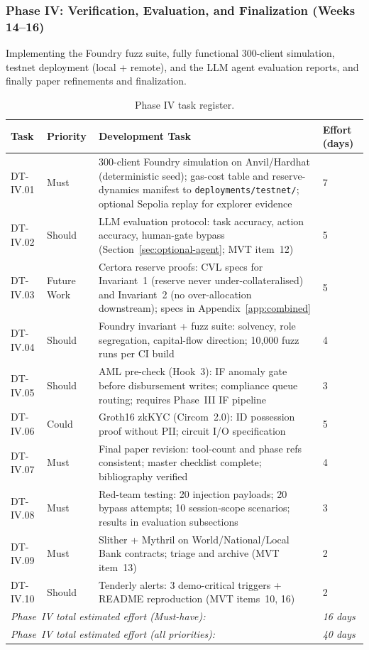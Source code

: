 \documentclass[12pt,a4paper]{report}
\newcommand{\tableheadcolor}{\rowcolor{TableHeadBg}}
\begin{document}
\subsubsection{Phase IV: Verification, Evaluation, and Finalization (Weeks 14--16)}

Implementing the Foundry fuzz suite, fully functional 300-client simulation, testnet deployment (local + remote), and the LLM agent evaluation reports, and finally paper refinements and finalization.

\begin{table}[H]
\centering
\caption[Phase IV task register]{Phase IV task register.}
\label{tab:phaseIV-tasks}
\begin{tabular}{p{1.8cm}p{1.8cm}p{7.5cm}p{1.5cm}}
\toprule
\tableheadcolor
\textbf{Task} & \textbf{Priority} & \textbf{Development Task} & \textbf{Effort (days)} \\
\midrule
DT-IV.01 & Must & 300-client Foundry simulation on Anvil/Hardhat (deterministic seed); gas-cost table and reserve-dynamics manifest to \texttt{deployments/testnet/}; optional Sepolia replay for explorer evidence & 7 \\
DT-IV.02 & Should & LLM evaluation protocol: task accuracy, action accuracy, human-gate bypass (Section~\ref{sec:optional-agent}; MVT item~12) & 5 \\
DT-IV.03 & Future Work & Certora reserve proofs: CVL specs for Invariant~1 (reserve never under-collateralised) and Invariant~2 (no over-allocation downstream); specs in Appendix~\ref{app:combined} & 5 \\
DT-IV.04 & Should & Foundry invariant + fuzz suite: solvency, role segregation, capital-flow direction; 10{,}000 fuzz runs per CI build & 4 \\
DT-IV.05 & Should & AML pre-check (Hook~3): IF anomaly gate before disbursement writes; compliance queue routing; requires Phase~III IF pipeline & 3 \\
DT-IV.06 & Could & Groth16 zkKYC (Circom~2.0): ID possession proof without PII; circuit I/O specification & 5 \\
DT-IV.07 & Must & Final paper revision: tool-count and phase refs consistent; master checklist complete; bibliography verified & 4 \\
DT-IV.08 & Must & Red-team testing: 20 injection payloads; 20 bypass attempts; 10 session-scope scenarios; results in evaluation subsections & 3 \\
DT-IV.09 & Must & Slither + Mythril on World/National/Local Bank contracts; triage and archive (MVT item~13) & 2 \\
DT-IV.10 & Should & Tenderly alerts: 3 demo-critical triggers + README reproduction (MVT items~10, 16) & 2 \\
\multicolumn{3}{l}{\textit{Phase~IV total estimated effort (Must-have):}} & \textit{16 days} \\
\multicolumn{3}{l}{\textit{Phase~IV total estimated effort (all priorities):}} & \textit{40 days} \\
\bottomrule
\end{tabular}
\end{table}
\end{document}
